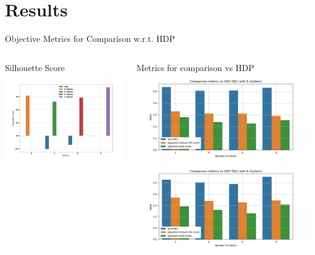 \documentclass{beamer}
\begin{document}
\section{Results}

\begin{frame}{Objective Metrics for Comparison w.r.t. HDP}
\begin{minipage}[\textheight]{\textwidth}
\begin{columns}[T]
	\begin{column}{0.6\textwidth}
	Silhouette Score 
	\centering
	\includegraphics[width=\textwidth, keepaspectratio]{./images/silh_score.png}
	\end{column}
	\begin{column}{0.6\textwidth}
	Metrics for comparison vs HDP
	\centering
	\includegraphics[width=\textwidth, keepaspectratio]{./images/metrics6.png}
	\includegraphics[width=\textwidth, keepaspectratio]{./images/metrics8.png}

\end{column}
\end{columns}
\end{minipage}
\end{frame}
\end{document}
